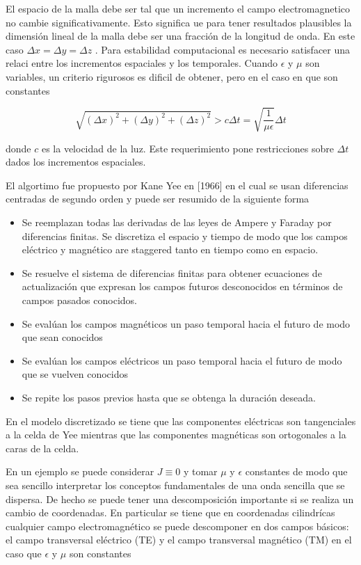\documentclass[]{article}
\begin{document}
El espacio de la malla debe ser tal que un incremento el campo
electromagnetico no cambie significativamente. Esto significa ue para
tener resultados plausibles la dimensión lineal de la malla debe ser una
fracción de la longitud de onda. En este caso
\(\Delta x = \Delta y = \Delta z\) . Para estabilidad computacional es
necesario satisfacer una relaci entre los incrementos espaciales y los
temporales. Cuando \(\epsilon\) y \(\mu\) son variables, un criterio
rigurosos es dificil de obtener, pero en el caso en que son constantes

\begin{equation}
\sqrt{ (\Delta x)^2+(\Delta y)^2+(\Delta z)^2} > c\Delta t = \sqrt{ \frac{1}{\mu \epsilon}}\Delta t
\end{equation}

donde \(c\) es la velocidad de la luz. Este requerimiento pone
restricciones sobre \(\Delta t\) dados los incrementos espaciales.

El algortimo fue propuesto por Kane Yee en {[}1966{]} en el cual se usan
diferencias centradas de segundo orden y puede ser resumido de la
siguiente forma

\begin{itemize}
\item Se reemplazan todas las derivadas de las leyes de Ampere y Faraday por diferencias finitas. Se discretiza el espacio y tiempo de modo que los campos eléctrico y magnético are staggered tanto en tiempo como en espacio. 
\item Se resuelve el sistema de diferencias finitas para obtener ecuaciones de actualización que expresan los campos futuros desconocidos en términos de campos pasados conocidos. 
\item Se evalúan los campos magnéticos un paso temporal hacia el futuro de modo que sean conocidos
\item Se evalúan los campos eléctricos un paso temporal hacia el futuro de modo que se vuelven conocidos
\item Se repite los pasos previos hasta que se obtenga la duración deseada. 
\end{itemize}

En el modelo discretizado se tiene que las componentes eléctricas son
tangenciales a la celda de Yee mientras que las componentes magnéticas
son ortogonales a la caras de la celda.

En un ejemplo se puede considerar \(J \equiv 0\) y tomar \(\mu\) y
\(\epsilon\) constantes de modo que sea sencillo interpretar los
conceptos fundamentales de una onda sencilla que se dispersa. De hecho
se puede tener una descomposición importante si se realiza un cambio de
coordenadas. En particular se tiene que en coordenadas cilindrícas
cualquier campo electromagnético se puede descomponer en dos campos
básicos: el campo transversal eléctrico (TE) y el campo transversal
magnético (TM) en el caso que \(\epsilon\) y \(\mu\) son constantes
\end{document}

